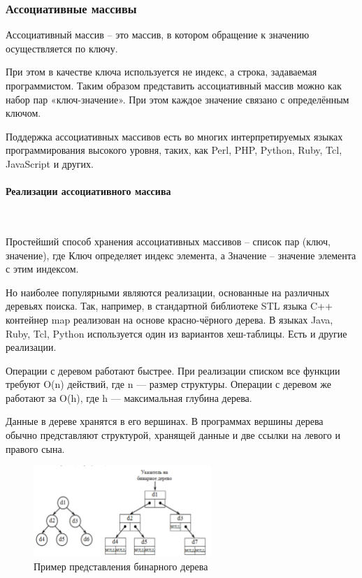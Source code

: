 \def\notedate{2021.11.22}
\def\currentauthor{Крехтунова Д.Д. (РК6-73Б)}

\subsubsection{Ассоциативные массивы}

Ассоциативный массив – это массив, в котором обращение к значению осуществляется по ключу.

При этом в качестве ключа используется не индекс, а строка, задаваемая программистом. Таким образом представить ассоциативный массив можно как набор пар «ключ-значение». При этом каждое значение связано с определённым ключом.

Поддержка ассоциативных массивов есть во многих интерпретируемых языках программирования высокого уровня, таких, как Perl, PHP, Python, Ruby, Tcl, JavaScript и других.

\paragraph{Реализации ассоциативного массива}
\

Простейший способ хранения ассоциативных массивов – список пар (ключ, значение), где Ключ определяет индекс элемента, а Значение – значение элемента с этим индексом.

Но наиболее популярными являются реализации, основанные на различных деревьях поиска. 
Так, например, в стандартной библиотеке STL языка C++ контейнер map реализован на основе красно-чёрного дерева. В языках Java, Ruby, Tcl, Python используется один из вариантов хеш-таблицы. Есть и другие реализации.

Операции с деревом работают быстрее. При реализации списком все функции требуют O(n) действий, где n — размер структуры. Операции с деревом же работают за O(h), где h — максимальная глубина дерева.

Данные в дереве хранятся в его вершинах. В программах вершины дерева обычно представляют структурой, хранящей данные и две ссылки на левого и правого сына. 

\begin{figure}[h]
	\centering
	\includegraphics[width=0.6\textwidth]{ResearchNotes/rndhpc_not_edt_2021_11_22/bin_tree.png}
	\caption{Пример представления бинарного дерева} 
\end{figure}

